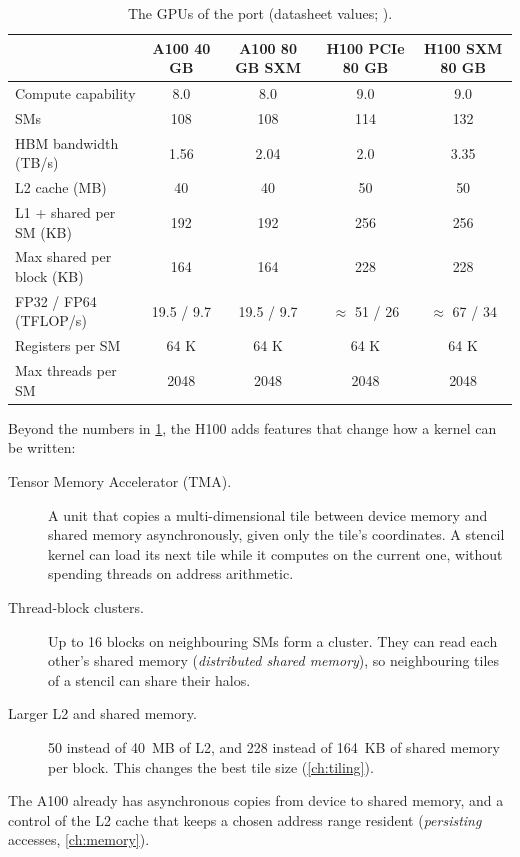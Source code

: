 \begin{table}[ht]
\centering
\small
\begin{tabular}{lcccc}
\toprule
 & A100 40 GB & A100 80 GB SXM & H100 PCIe 80 GB & H100 SXM 80 GB \\
\midrule
Compute capability & 8.0 & 8.0 & 9.0 & 9.0 \\
SMs & 108 & 108 & 114 & 132 \\
HBM bandwidth (TB/s) & 1.56 & 2.04 & 2.0 & 3.35 \\
L2 cache (MB) & 40 & 40 & 50 & 50 \\
L1 + shared per SM (KB) & 192 & 192 & 256 & 256 \\
Max shared per block (KB) & 164 & 164 & 228 & 228 \\
FP32 / FP64 (TFLOP/s) & 19.5 / 9.7 & 19.5 / 9.7 & $\approx$ 51 / 26 & $\approx$ 67 / 34 \\
Registers per SM & 64 K & 64 K & 64 K & 64 K \\
Max threads per SM & 2048 & 2048 & 2048 & 2048 \\
\bottomrule
\end{tabular}
\caption{The GPUs of the port (datasheet values; \citealp{nvidia2020a100,nvidia2022h100}).}
\label{tab:gpus}
\end{table}

Beyond the numbers in \cref{tab:gpus}, the H100 adds features that change how a kernel can be written:
\begin{description}
  \item[Tensor Memory Accelerator (TMA).] A unit that copies a multi-dimensional tile between device memory and
    shared memory asynchronously, given only the tile's coordinates. A stencil kernel can load its next tile while it
    computes on the current one, without spending threads on address arithmetic.
  \item[Thread-block clusters.] Up to 16 blocks on neighbouring SMs form a cluster. They can read each other's shared
    memory (\emph{distributed shared memory}), so neighbouring tiles of a stencil can share their halos.
  \item[Larger L2 and shared memory.] 50 instead of 40~MB of L2, and 228 instead of 164~KB of shared memory per
    block. This changes the best tile size (\cref{ch:tiling}).
\end{description}
The A100 already has asynchronous copies from device to shared memory, and a control of the L2 cache that keeps a
chosen address range resident (\emph{persisting} accesses, \cref{ch:memory}).

